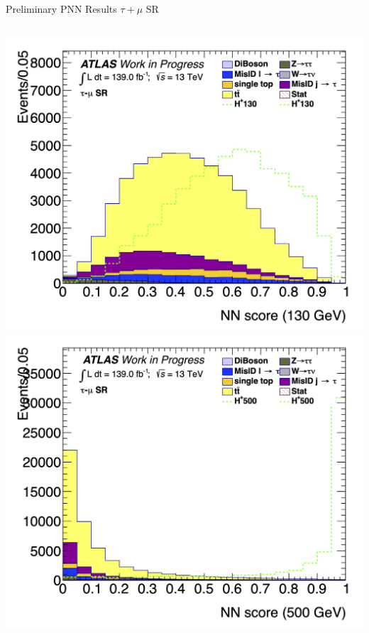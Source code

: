 \documentclass[aspectratio=169,xcolor=table]{beamer}
\begin{document}
\begin{frame}[t]{Preliminary PNN Results $\tau+\mu$ SR}
\begin{columns}[t]
        \includegraphics[height=.43\textheight,keepaspectratio=true]{Scores/taulep/myOutDirClfEval_1p_noUpsilon_test_full/clf_score_GB200_mass_130to130_SR_TAUMU.png}
        \includegraphics[height=.43\textheight,keepaspectratio=true]{Scores/taulep/myOutDirClfEval_1p_noUpsilon_test_full/clf_score_GB200_mass_500to500_SR_TAUMU.png}


\end{columns}
\end{frame}
\end{document}
